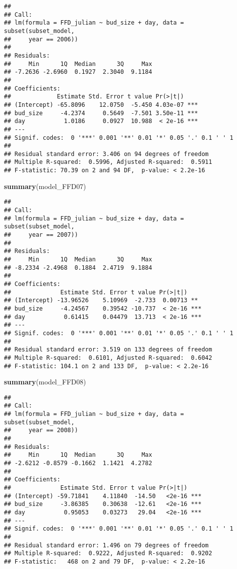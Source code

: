 \documentclass[]{article}
\newenvironment{Shaded}{\begin{snugshade}}{\end{snugshade}}
\newcommand{\KeywordTok}[1]{\textcolor[rgb]{0.13,0.29,0.53}{\textbf{#1}}}
\newcommand{\NormalTok}[1]{#1}
\begin{document}
\begin{verbatim}
## 
## Call:
## lm(formula = FFD_julian ~ bud_size + day, data = subset(subset_model, 
##     year == 2006))
## 
## Residuals:
##     Min      1Q  Median      3Q     Max 
## -7.2636 -2.6960  0.1927  2.3040  9.1184 
## 
## Coefficients:
##             Estimate Std. Error t value Pr(>|t|)    
## (Intercept) -65.8096    12.0750  -5.450 4.03e-07 ***
## bud_size     -4.2374     0.5649  -7.501 3.50e-11 ***
## day           1.0186     0.0927  10.988  < 2e-16 ***
## ---
## Signif. codes:  0 '***' 0.001 '**' 0.01 '*' 0.05 '.' 0.1 ' ' 1
## 
## Residual standard error: 3.406 on 94 degrees of freedom
## Multiple R-squared:  0.5996, Adjusted R-squared:  0.5911 
## F-statistic: 70.39 on 2 and 94 DF,  p-value: < 2.2e-16
\end{verbatim}

\begin{Shaded}
\begin{Highlighting}[]
\KeywordTok{summary}\NormalTok{(model_FFD07)}
\end{Highlighting}
\end{Shaded}

\begin{verbatim}
## 
## Call:
## lm(formula = FFD_julian ~ bud_size + day, data = subset(subset_model, 
##     year == 2007))
## 
## Residuals:
##     Min      1Q  Median      3Q     Max 
## -8.2334 -2.4968  0.1884  2.4719  9.1884 
## 
## Coefficients:
##              Estimate Std. Error t value Pr(>|t|)    
## (Intercept) -13.96526    5.10969  -2.733  0.00713 ** 
## bud_size     -4.24567    0.39542 -10.737  < 2e-16 ***
## day           0.61415    0.04479  13.713  < 2e-16 ***
## ---
## Signif. codes:  0 '***' 0.001 '**' 0.01 '*' 0.05 '.' 0.1 ' ' 1
## 
## Residual standard error: 3.519 on 133 degrees of freedom
## Multiple R-squared:  0.6101, Adjusted R-squared:  0.6042 
## F-statistic: 104.1 on 2 and 133 DF,  p-value: < 2.2e-16
\end{verbatim}

\begin{Shaded}
\begin{Highlighting}[]
\KeywordTok{summary}\NormalTok{(model_FFD08)}
\end{Highlighting}
\end{Shaded}

\begin{verbatim}
## 
## Call:
## lm(formula = FFD_julian ~ bud_size + day, data = subset(subset_model, 
##     year == 2008))
## 
## Residuals:
##     Min      1Q  Median      3Q     Max 
## -2.6212 -0.8579 -0.1662  1.1421  4.2782 
## 
## Coefficients:
##              Estimate Std. Error t value Pr(>|t|)    
## (Intercept) -59.71841    4.11840  -14.50   <2e-16 ***
## bud_size     -3.86385    0.30638  -12.61   <2e-16 ***
## day           0.95053    0.03273   29.04   <2e-16 ***
## ---
## Signif. codes:  0 '***' 0.001 '**' 0.01 '*' 0.05 '.' 0.1 ' ' 1
## 
## Residual standard error: 1.496 on 79 degrees of freedom
## Multiple R-squared:  0.9222, Adjusted R-squared:  0.9202 
## F-statistic:   468 on 2 and 79 DF,  p-value: < 2.2e-16
\end{verbatim}
\end{document}
